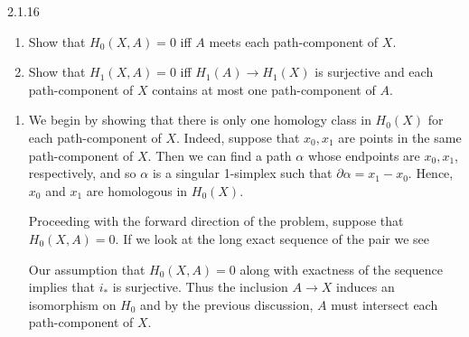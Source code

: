 \documentclass{article}
\begin{document}
\begin{exercise}{2.1.16}{\parindent}
  \vspace{-20px}
  \begin{enumerate}
  \item Show that $H_0(X,A) = 0$ iff $A$ meets each path-component of
    $X$.
  \item Show that $H_1(X,A) = 0$ iff $H_1(A) \to H_1(X)$ is surjective
    and each path-component of $X$ contains at most one path-component
    of $A$.
  \end{enumerate}
\end{exercise}
\begin{solution}{\parindent}
  \begin{enumerate}
  \item We begin by showing that there is only one homology class in
    $H_0(X)$ for each path-component of $X$. Indeed, suppose that
    $x_0,x_1$ are points in the same path-component of $X$. Then we
    can find a path $\alpha$ whose endpoints are $x_0,x_1$,
    respectively, and so $\alpha$ is a singular 1-simplex such that
    $\partial \alpha = x_1 - x_0$. Hence, $x_0$ and $x_1$ are
    homologous in $H_0(X)$.

    Proceeding with the forward direction of the problem, suppose that
    $H_0(X,A) = 0$. If we look at the long exact sequence of the pair
    we see
    \begin{center}
    \end{center}
    Our assumption that $H_0(X,A) = 0$ along with exactness of the
    sequence implies that $i_\ast$ is surjective. Thus the inclusion
    $A \to X$ induces an isomorphism on $H_0$ and by the previous
    discussion, $A$ must intersect each path-component of $X$.


\end{enumerate}
\end{solution}
\end{document}
